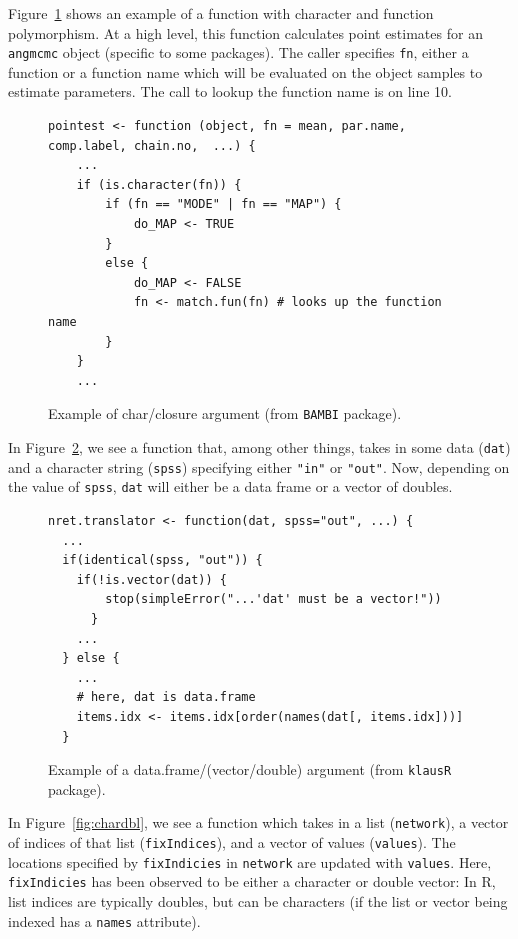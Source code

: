 \documentclass[acmsmall,10pt,review,anonymous]{acmart}\settopmatter{printfolios=true,printccs=false,printacmref=false}
\begin{document}
Figure~\ref{fig:charclos} shows an example of a function with character and function polymorphism.
At a high level, this function calculates point estimates for an {\tt angmcmc} object (specific to some packages).
The caller specifies {\tt fn}, either a function or a function name which will be evaluated on the object samples to estimate parameters.
The call to lookup the function name is on line 10.

\begin{figure}[!hb]{\small\begin{lstlisting}[style=R]
pointest <- function (object, fn = mean, par.name, comp.label, chain.no,  ...) {
    ...
    if (is.character(fn)) {
        if (fn == "MODE" | fn == "MAP") {
            do_MAP <- TRUE
        }
        else {
            do_MAP <- FALSE
            fn <- match.fun(fn) # looks up the function name
        }
    }
    ...
\end{lstlisting}}\caption{Example of char/closure argument (from {\tt BAMBI} package).}\label{fig:charclos}\end{figure}

In Figure~\ref{fig:dfdbl}, we see a function that, among other things, takes in some data ({\tt dat}) and a character string ({\tt spss}) specifying either {\tt "in"} or {\tt "out"}.
Now, depending on the value of {\tt spss}, {\tt dat} will either be a data frame or a vector of doubles.

\begin{figure}[!hb]{\small\begin{lstlisting}[style=R]
nret.translator <- function(dat, spss="out", ...) {
  ...
  if(identical(spss, "out")) {
    if(!is.vector(dat)) {
        stop(simpleError("...'dat' must be a vector!"))
      }
    ...
  } else {
    ...
    # here, dat is data.frame
    items.idx <- items.idx[order(names(dat[, items.idx]))]
  }
\end{lstlisting}}\caption{Example of a data.frame/(vector/double) argument (from {\tt klausR} package).}\label{fig:dfdbl}\end{figure}

In Figure~\ref{fig:chardbl}, we see a function which takes in a list ({\tt network}), a vector of indices of that list ({\tt fixIndices}), and a vector of values ({\tt values}).
The locations specified by {\tt fixIndicies} in {\tt network} are updated with {\tt values}.
Here, {\tt fixIndicies} has been observed to be either a character or double vector:
In R, list indices are typically doubles, but can be characters (if the list or vector being indexed has a {\tt names} attribute).
\end{document}
